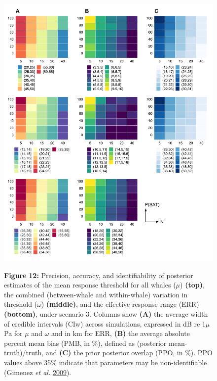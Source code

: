 \documentclass[
]{article}
\begin{document}
\begin{figure}

{\centering \includegraphics[width=0.9\linewidth]{fig/fig_heatplot_S3} 

}

\textbf{Figure }{\textbf{12:} \hypertarget{fig12}{}Precision, accuracy, and identifiability of posterior estimates of the mean response threshold for all whales (\(\mu\)) \textbf{(top)}, the combined (between-whale and within-whale) variation in threshold (\(\omega\)) \textbf{(middle)}, and the effective response range (ERR) \textbf{(bottom)}, under scenario 3. Columns show \textbf{(A)} the average width of credible intervals (CIw) across simulations, expressed in dB re 1\(\mu\)Pa for \(\mu\) and \(\omega\) and in km for ERR, \textbf{(B)} the average absolute percent mean bias (PMB, in \%), defined as (posterior mean-truth)/truth, and \textbf{(C)} the prior posterior overlap (PPO, in \%). PPO values above 35\% indicate that parameters may be non-identifiable (Gimenez \emph{et al.} \protect\hyperlink{ref-Gimenez2009}{2009}).}\label{fig:unnamed-chunk-11}
\end{figure}
\end{document}
